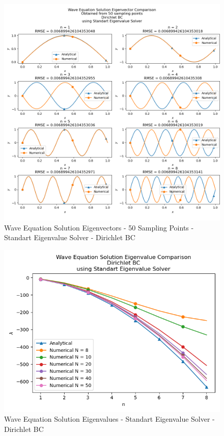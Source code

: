 \documentclass[letterpaper,12pt]{article}
\begin{document}
\begin{figure}[H]
\centerline{\includegraphics[width=\linewidth]{figures/1_50_Standart_Eigenvalue_Solver_d_eigenvector.png}}
\caption{Wave Equation Solution Eigenvectors - 50 Sampling Points - Standart Eigenvalue Solver - Dirichlet BC}
\label{fig:1_50_Standart_Eigenvalue_Solver_d_eigenvector}
\end{figure}


\begin{figure}[H]
\centerline{\includegraphics[width=\linewidth]{figures/1_Standart_Eigenvalue_Solver_d_eigenvalue.png}}
\caption{Wave Equation Solution Eigenvalues - Standart Eigenvalue Solver - Dirichlet BC}
\label{fig:1_Standart_Eigenvalue_Solver_d_eigenvalue}
\end{figure}
\end{document}
